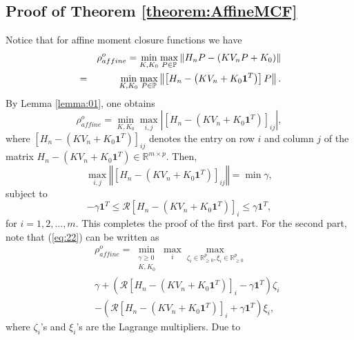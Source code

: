 \documentclass[letterpaper, 10 pt, conference]{ieeeconf}
\begin{document}
\subsection*{Proof of Theorem \protect\ref{theorem:AffineMCF}}

Notice that for affine moment closure functions we have%
\begin{eqnarray}
&&\rho _{affine}^{o}=\min_{K,K_{0}}\max_{P\in \mathbb{P}}\left\Vert
H_{n}P-\left( KV_{n}P+K_{0}\right) \right\Vert  \notag \\
&=&\min_{K,K_{0}}\max_{P\in \mathbb{P}}\left\Vert \left[ H_{n}-\left(
KV_{n}+K_{0}\mathbf{1}^{T}\right) \right] P\right\Vert .  \label{eq:21}
\end{eqnarray}%
By Lemma \ref{lemma:01}, one obtains%
\begin{equation}
\rho _{affine}^{o}=\min_{K,K_{0}}\max_{i,j}\left\vert \left[ H_{n}-\left(
KV_{n}+K_{0}\mathbf{1}^{T}\right) \right] _{ij}\right\vert ,  \label{eq:22}
\end{equation}%
where $\left[ H_{n}-\left( KV_{n}+K_{0}\mathbf{1}^{T}\right) \right] _{ij}$
denotes the entry on row $i$ and column $j$ of the matrix $H_{n}-\left(
KV_{n}+K_{0}\mathbf{1}^{T}\right) \in \mathbb{R}^{m\times p}$. Then,%
\begin{equation*}
\max_{i,j}\left\Vert \left[ H_{n}-\left( KV_{n}+K_{0}\mathbf{1}^{T}\right) %
\right] _{ij}\right\Vert =\min \gamma ,
\end{equation*}%
subject to 
\begin{equation*}
-\gamma \mathbf{1}^{T}\leq \mathcal{R}\left[ H_{n}-\left( KV_{n}+K_{0}%
\mathbf{1}^{T}\right) \right] _{i}\leq \gamma \mathbf{1}^{T},
\end{equation*}
for $i=1,2,...,m$. This completes the proof of the first part. For the
second part, note that (\ref{eq:22}) can be written as%
\begin{eqnarray*}
&&\rho _{affine}^{o}=\min_{\substack{ \gamma \geq 0  \\ K,K_{0}}}%
\max_{i}\max_{\zeta _{i}\in \mathbb{R}_{\geq 0}^{p},\xi _{i}\in \mathbb{R}%
_{\geq 0}^{p}} \\
&&\gamma +\left( \mathcal{R}\left[ H_{n}-\left( KV_{n}+K_{0}\mathbf{1}%
^{T}\right) \right] _{i}-\gamma \mathbf{1}^{T}\right) \zeta _{i} \\
&&-\left( \mathcal{R}\left[ H_{n}-\left( KV_{n}+K_{0}\mathbf{1}^{T}\right) %
\right] _{i}+\gamma \mathbf{1}^{T}\right) \xi _{i},
\end{eqnarray*}%
where $\zeta _{i}$'s and $\xi _{i}$'s are the Lagrange multipliers. Due to
\end{document}
